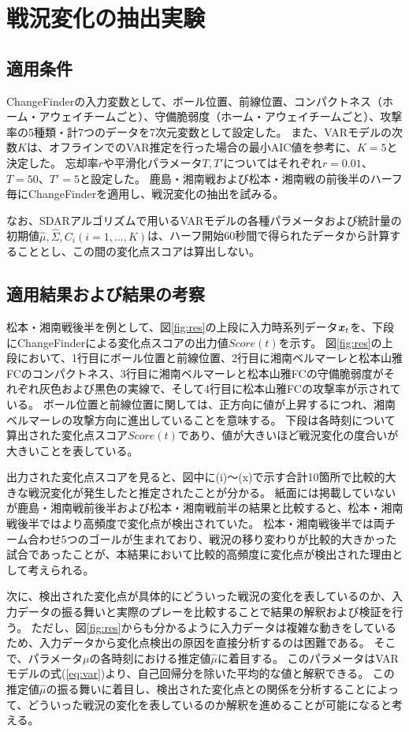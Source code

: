 \section{戦況変化の抽出実験}
\label{sec:exp}

\subsection{適用条件}
ChangeFinderの入力変数として、ボール位置、前線位置、コンパクトネス（ホーム・アウェイチームごと）、守備脆弱度（ホーム・アウェイチームごと）、攻撃率の5種類・計7つのデータを7次元変数として設定した。
また、VARモデルの次数$K$は、オフラインでのVAR推定を行った場合の最小AIC値を参考に、$K=5$と決定した。
忘却率$r$や平滑化パラメータ$T,T′$についてはそれぞれ$r=0.01$、$T=50$、$T'=5$と設定した。
鹿島・湘南戦および松本・湘南戦の前後半のハーフ毎にChangeFinderを適用し、戦況変化の抽出を試みる。

なお、SDARアルゴリズムで用いるVARモデルの各種パラメータおよび統計量の初期値$\hat{\mu},\hat{\Sigma},C_i(i=1,...,K)$は、ハーフ開始60秒間で得られたデータから計算することとし、この間の変化点スコアは算出しない。

\subsection{適用結果および結果の考察}
松本・湘南戦後半を例として、図\ref{fig:res}の上段に入力時系列データ$\mbox{\boldmath $x$}_t$を、下段にChangeFinderによる変化点スコアの出力値$Score(t)$を示す。
図\ref{fig:res}の上段において、1行目にボール位置と前線位置、2行目に湘南ベルマーレと松本山雅FCのコンパクトネス、3行目に湘南ベルマーレと松本山雅FCの守備脆弱度がそれぞれ灰色および黒色の実線で、そして4行目に松本山雅FCの攻撃率が示されている。
ボール位置と前線位置に関しては、正方向に値が上昇するにつれ、湘南ベルマーレの攻撃方向に進出していることを意味する。
下段は各時刻について算出された変化点スコア$Score(t)$であり、値が大きいほど戦況変化の度合いが大きいことを表している。

出力された変化点スコアを見ると、図中に(i)～(x)で示す合計10箇所で比較的大きな戦況変化が発生したと推定されたことが分かる。
紙面には掲載していないが鹿島・湘南戦前後半および松本・湘南戦前半の結果と比較すると、松本・湘南戦後半ではより高頻度で変化点が検出されていた。
松本・湘南戦後半では両チーム合わせ5つのゴールが生まれており、戦況の移り変わりが比較的大きかった試合であったことが、本結果において比較的高頻度に変化点が検出された理由として考えられる。

次に、検出された変化点が具体的にどういった戦況の変化を表しているのか、入力データの振る舞いと実際のプレーを比較することで結果の解釈および検証を行う。
ただし、図\ref{fig:res}からも分かるように入力データは複雑な動きをしているため、入力データから変化点検出の原因を直接分析するのは困難である。
そこで、パラメータ$\mu$の各時刻における推定値$\hat{\mu}$に着目する。
このパラメータはVARモデルの式(\ref{eq:var})より、自己回帰分を除いた平均的な値と解釈できる。
この推定値$\hat{\mu}$の振る舞いに着目し、検出された変化点との関係を分析することによって、どういった戦況の変化を表しているのか解釈を進めることが可能になると考える。

